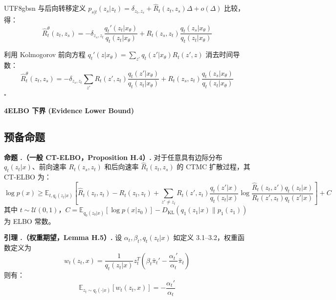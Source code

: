 \documentclass[11pt,a4paper]{article}
\newcounter{proposition}[section]
\newcounter{lemma}[section]
\newcounter{theorem}[section]
\renewcommand{\theproposition}{\thesection.\arabic{proposition}}
\renewcommand{\thelemma}{\thesection.\arabic{lemma}}
\newcommand{\Dkl}{D_{\mathrm{KL}}}
\begin{document}
\begin{CJK}{UTF8}{gbsn}
与后向转移定义 $p_{s|t}(z_s|z_t) = \delta_{z_t,z_s} + \hat{R}_t(z_t, z_s)\Delta + o(\Delta)$ 比较，得：
\[
\hat{R}_t^\theta(z_t, z_s) = -\delta_{z_s,z_t}\frac{q_t'(z_t|x_\theta)}{q_t(z_t|x_\theta)} + R_t(z_s, z_t)\frac{q_t(z_s|x_\theta)}{q_t(z_t|x_\theta)}
\]

利用 Kolmogorov 前向方程 $q_t'(z|x_\theta) = \sum_{z'} q_t(z'|x_\theta) R_t(z', z)$ 消去时间导数：
\[
\hat{R}_t^\theta(z_t, z_s) = -\delta_{z_s,z_t} \sum_{z'} R_t(z', z_t) \frac{q_t(z'|x_\theta)}{q_t(z_t|x_\theta)} + R_t(z_s, z_t)\frac{q_t(z_s|x_\theta)}{q_t(z_t|x_\theta)}
\]
\hfill $\square$












\begin{center}
{\LARGE\bfseries 4\quad ELBO 下界 (Evidence Lower Bound)}
\end{center}

\setcounter{section}{4}
\setcounter{subsection}{0}
\setcounter{theorem}{0}

\subsection{预备命题}

\begin{propbox}
\textbf{命题 \theproposition（一般 CT-ELBO，Proposition H.4）.}
对于任意具有边际分布 $q_t(z_t|x)$、前向速率 $R_t(z_s, z_t)$ 和后向速率 $\hat{R}_t(z_t, z_s)$ 的 CTMC 扩散过程，其 CT-ELBO 为：
\[
\log p(x) \geq \mathbb{E}_{t, q_t(z_t|x)} \left[\hat{R}_t(z_t, z_t) - R_t(z_t, z_t) + \sum_{z' \neq z_t} R_t(z', z_t) \frac{q_t(z'|x)}{q_t(z_t|x)} \log \frac{\hat{R}_t(z_t, z') q_t(z_t|x)}{R_t(z', z_t) q_t(z'|x)} \right] + C
\]
其中 $t \sim \mathcal{U}(0,1)$，$C = \mathbb{E}_{q_0(z_0|x)}[\log p(x|z_0)] - \Dkl(q_1(z_1|x) \| p_1(z_1))$ 为 ELBO 常数。
\end{propbox}

\begin{lembox}
\textbf{引理 \thelemma（权重期望，Lemma H.5）.}
设 $\alpha_t, \beta_t, q_t(z_t|x)$ 如定义 3.1--3.2，权重函数定义为
\[
w_t(z_t, x) = \frac{1}{q_t(z_t|x)} z_t^T \left(\beta_t \bar{\pi}_t' - \frac{\alpha_t'}{\alpha_t}\bar{\pi}_t\right)
\]
则有：
\[
\mathbb{E}_{z_t \sim q_t(\cdot|x)} [w_t(z_t, x)] = -\frac{\alpha_t'}{\alpha_t}
\]
\end{lembox}


\end{CJK}
\end{document}
